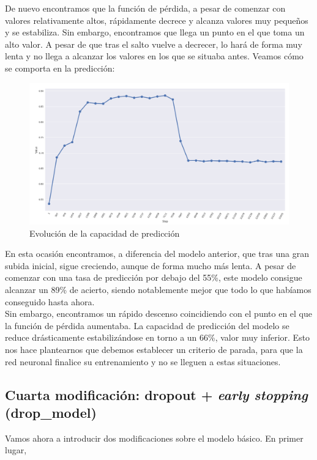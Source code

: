 \documentclass[11pt]{article}
\theoremstyle{plain}
\theoremstyle{definition}
\begin{document}
De nuevo encontramos que la función de pérdida, a pesar de comenzar con 
valores relativamente altos, rápidamente decrece y alcanza valores muy 
pequeños y se estabiliza. Sin embargo, encontramos que llega un punto 
en el que toma un alto valor. A pesar de que tras el salto vuelve a 
decrecer, lo hará de forma muy lenta y no llega a alcanzar los valores
en los que se situaba antes. Veamos cómo se comporta en la predicción:

\begin{figure}[H]
  \centering \includegraphics[width=.95\textwidth]{imgs/accuracy_vlr}
  \caption{Evolución de la capacidad de predicción}
\end{figure}

En esta ocasión encontramos, a diferencia del modelo anterior, que tras
una gran subida inicial, sigue creciendo, aunque de forma mucho más lenta.
A pesar de comenzar con una tasa de predicción por debajo del 55\%, este
modelo consigue alcanzar un 89\% de acierto, siendo notablemente mejor que
todo lo que habíamos conseguido hasta ahora.\\

Sin embargo, encontramos un rápido descenso coincidiendo con el punto en 
el que la función de pérdida aumentaba. La capacidad de predicción del 
modelo se reduce drásticamente estabilizándose en torno a un 66\%, valor 
muy inferior. Esto nos hace plantearnos que debemos establecer un criterio
de parada, para que la red neuronal finalice su entrenamiento y no se 
lleguen a estas situaciones.

\subsection{Cuarta modificación: dropout + \textit{early stopping}
  (drop\_model)}

Vamos ahora a introducir dos modificaciones sobre el modelo básico. En
primer lugar,
\end{document}
